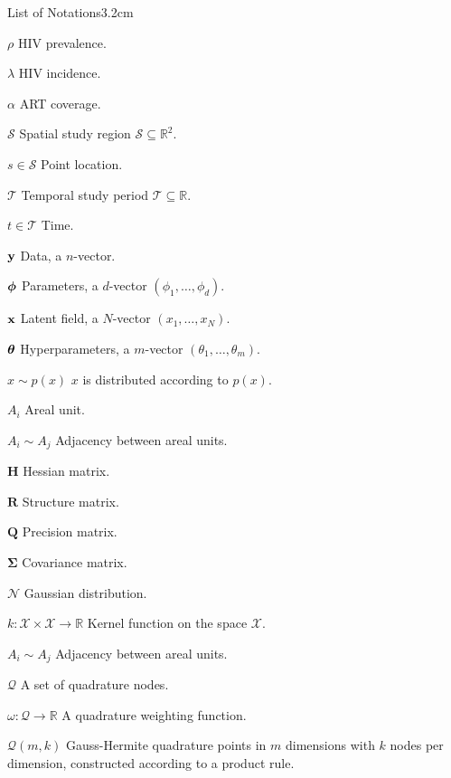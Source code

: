 \begin{mclistof}{List of Notations}{3.2cm}

\item[$\rho$] HIV prevalence.
\item[$\lambda$] HIV incidence.
\item[$\alpha$] ART coverage.
\item[$\mathcal{S}$] Spatial study region $\mathcal{S} \subseteq \mathbb{R}^2$.
\item[$s \in \mathcal{S}$] Point location.
\item[$\mathcal{T}$] Temporal study period $\mathcal{T} \subseteq \mathbb{R}$.
\item[$t \in \mathcal{T}$] Time.
\item[$\boldsymbol{\mathbf{y}}$] Data, a $n$-vector.
\item[$\boldsymbol{\mathbf{\phi}}$] Parameters, a $d$-vector $(\phi_1, \ldots, \phi_d)$.
\item[$\mathbf{x}$] Latent field, a $N$-vector $(x_1, \ldots, x_N)$.
\item[$\bm{\theta}$] Hyperparameters, a $m$-vector $(\theta_1, \ldots, \theta_m)$.
\item[$x \sim p(x)$] $x$ is distributed according to $p(x)$.
\item[$A_i$] Areal unit.
\item[$A_i \sim A_j$] Adjacency between areal units.
\item[$\mathbf{H}$] Hessian matrix.
\item[$\mathbf{R}$] Structure matrix.
\item[$\mathbf{Q}$] Precision matrix.
\item[$\bm{\Sigma}$] Covariance matrix.
\item[$\mathcal{N}$] Gaussian distribution.
\item[$k: \mathcal{X} \times \mathcal{X} \to \mathbb{R}$] Kernel function on the space $\mathcal{X}$.
\item[$A_i \sim A_j$] Adjacency between areal units.
\item[$\mathcal{Q}$] A set of quadrature nodes.
\item[$\omega: \mathcal{Q} \to \mathbb{R}$] A quadrature weighting function.
\item[$\mathcal{Q}(m, k)$] Gauss-Hermite quadrature points in $m$ dimensions with $k$ nodes per dimension, constructed according to a product rule.

\end{mclistof} 